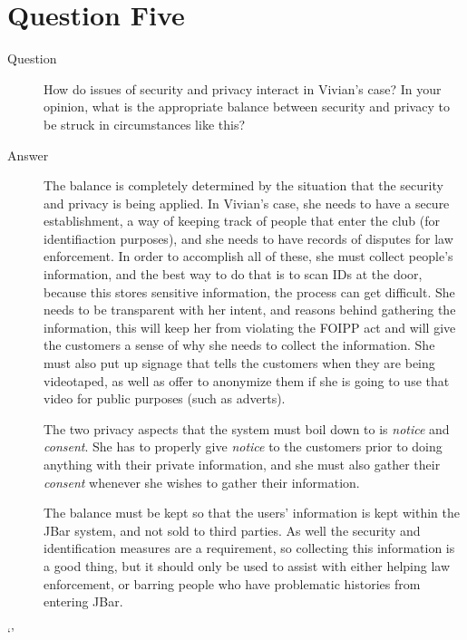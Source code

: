\documentclass{article}
\numberwithin{equation}{section} %
\numberwithin{figure}{section} %
\numberwithin{table}{section} %
\begin{document}
\section {Question Five}
\begin{description}
	\item[Question] How do issues of security and privacy interact in Vivian’s case? In your opinion, what is the appropriate balance between security and privacy to be struck in circumstances like this?
	\item [Answer] The balance is completely determined by the situation that the security and privacy is being applied.  In Vivian's case, she needs to have a secure establishment, a way of keeping track of people that enter the club (for identifiaction purposes), and she needs to have records of disputes for law enforcement.  In order to accomplish all of these, she must collect people's information, and the best way to do that is to scan IDs at the door, because this stores sensitive information, the process can get difficult.  She needs to be transparent with her intent, and reasons behind gathering the information, this will keep her from violating the FOIPP act and will give the customers a sense of why she needs to collect the information.  She must also put up signage that tells the customers when they are being videotaped, as well as offer to anonymize them if she is going to use that video for public purposes (such as adverts).  

	The two privacy aspects that the system must boil down to is \textit{notice} and \textit{consent}.  She has to properly give \textit{notice} to the customers prior to doing anything with their private information, and she must also gather their \textit{consent} whenever she wishes to gather their information.

	The balance must be kept so that the users' information is kept within the JBar system, and not sold to third parties.  As well the security and identification measures are a requirement, so collecting this information is a good thing, but it should only be used to assist with either helping law enforcement, or barring people who have problematic histories from entering JBar. 
\end{description}

 
`'
\end{document}
